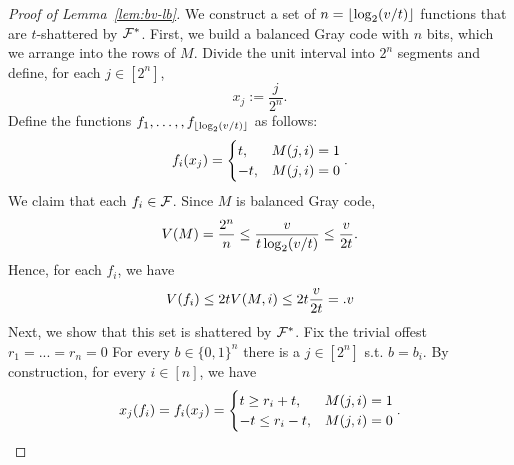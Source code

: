 \begin{proof}[Proof of Lemma~\ref{lem:bv-lb}]
  We construct a set of $n = \left\lfloor\log_2(v/t)\right\rfloor$ functions that are $t$-shattered by $\mathcal{F}^*$.
  First, we build a balanced Gray code \citep{flahive2007balancing} with $n$ bits,
which we arrange into the rows of $M$.
Divide the unit interval into $2^n
$ segments and define, for each $j\in[2^n]$,
\[
x_j := \frac{j}{2^n}
.
\]
  Define the functions $f_1,\ldots,,f_{\left\lfloor\log_2(v/t)\right\rfloor}$ as follows:
  \[f_i(x_j) =
    \begin{cases}
      t, &
      M(j,i)
      = 1
      \\
      -t, &
      M(j,i)
      = 0
    \end{cases}.
  \]
We claim that each
$
f_i \in \mathcal{F}$.
Since
$M$ is balanced Gray code,
\[V(M) = \frac{2^n}{n} \le \frac{v}{t \log_2(v/t)} \leq \frac{v}{2t}.\]
Hence, for each
$f_i$,
we have
  \[V(f_i) \leq 2 t V(M,i) \leq 2 t \frac{v}{2t} = .v\]
Next, we show
that this set is shattered by $\mathcal{F}^*$.
Fix the trivial offest $r_1=...=r_n = 0$
For every $b \in \{0,1\}^n$ there is a $j \in [2^n]$ s.t. $b = b_i$.
By construction,
for every
$i \in [n]$,
we have
  \[x_j(f_i) = f_i(x_j) =
    \begin{cases}
      t \geq r_i + t, & M(j,i)
              = 1 \\
              -t \leq r_i - t, & M(j,i)
              = 0
    \end{cases}.
  \]
\end{proof}




    



